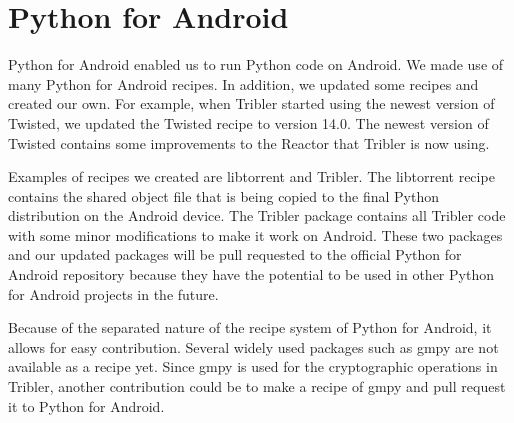 \section{Python for Android}
	Python for Android enabled us to run Python code on Android. We made use of many Python for Android recipes. In addition, we updated some recipes and created our own. For example, when Tribler started using the newest version of Twisted, we updated the Twisted recipe to version 14.0. The newest version of Twisted contains some improvements to the Reactor that Tribler is now using.
	
	Examples of recipes we created are libtorrent and Tribler. The libtorrent recipe contains the shared object file that is being copied to the final Python distribution on the Android device. The Tribler package contains all Tribler code with some minor modifications to make it work on Android. These two packages and our updated packages will be pull requested to the official Python for Android repository because they have the potential to be used in other Python for Android projects in the future.
	
	Because of the separated nature of the recipe system of Python for Android, it allows for easy contribution. Several widely used packages such as gmpy are not available as a recipe yet. Since gmpy is used for the cryptographic operations in Tribler, another contribution could be to make a recipe of gmpy and pull request it to Python for Android.